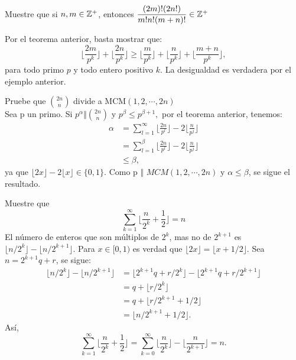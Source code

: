 	\begin{ej}

		Muestre que si $n,m \in \mathbb{Z}^{+}$, entonces $\dfrac{(2m)!(2n!)}{m!n!(m + n)!}\in\mathbb{Z}^{+}$
		
		Por el teorema anterior, basta mostrar que:
		$$\bigg\lfloor\frac{2m}{p^{k}}\bigg\rfloor + \bigg\lfloor\frac{2n}{p^{k}}\bigg\rfloor \geq \biggl\lfloor\frac{m}{p^{k}}\bigg\rfloor + \bigg\lfloor\frac{n}{p^{k}}\bigg\rfloor + \bigg\lfloor\frac{m + n}{p^{k}}\bigg\rfloor,$$ para todo primo $p$ y todo entero positivo $k$. La desigualdad es verdadera por el ejemplo anterior.
	\end{ej}
	\begin{ej}
		Pruebe que $\binom{2n}{n}$ divide a MCM$(1,2,\cdots,2n)$\\
		
		Sea p un primo. Si $p^{\alpha} \Vert \binom{2n}{n} \text{ y } p^{\beta} \leq p^{\beta + 1},$ por el teorema anterior, tenemos:
		\begin{align*}
			\alpha &= \sum_{l=1}^{\infty} \biggl\lfloor\frac{2n}{p^{l}}\biggr\rfloor - 2\bigg\lfloor\frac{n}{p^{j}}\biggr\rfloor\\
			&= \sum_{l=1}^{\beta} \biggl\lfloor\frac{2n}{p^{l}}\biggr\rfloor - 2\bigg\lfloor\frac{n}{p^{j}}\biggr\rfloor\\
			&\leq \beta,
		\end{align*}
		ya que $\lfloor 2x \rfloor - 2\lfloor x \rfloor \in \{0,1\}$. Como p $\Vert$ $MCM(1,2,\cdots,2n) \text{ y } \alpha \leq \beta$, se sigue el resultado.
	\end{ej}
	\begin{ej}
		Muestre que 
		$$\sum_{k=1}^{\infty} \biggr\lfloor \frac{n}{2^{k}} + \frac{1}{2} \biggr\rfloor = n$$
		 El n\'umero de enteros que son m\'ultiplos de $2^{k}$, mas no de $2^{k + 1}$ es \\
		 $\lfloor {n}/{2^{k}} \rfloor - \big\lfloor{n}/{2^{k + 1}} \rfloor$. Para $x \in [0,1)$ es verdad que $\lfloor 2x \rfloor = \lfloor x + 1/2 \rfloor$. Sea $n = 2^{k + 1}q + r$, se sigue:
		 \begin{align*}
		 	\lfloor {n}/{2^{k}} \rfloor - \big\lfloor{n}/{2^{k + 1}} \rfloor &= \lfloor {2^{k+1}q + r}/{2^{k}} \rfloor - \big\lfloor{2^{k+1}q + r}/{2^{k + 1}} \rfloor\\
		 	&= q + \lfloor r/2^{k} \rfloor\\
		 	&= q + \lfloor r/2^{k + 1} + 1/2 \rfloor\\
		 	&= \lfloor n/2^{k+1} + 1/2 \rfloor.
		 \end{align*}
		 As\'i,
		 $$\sum_{k = 1}^{\infty} \biggr\lfloor \frac{n}{2^{k}} + \frac{1}{2} \biggr\rfloor = \sum_{k = 0}^{\infty} \biggr\lfloor \frac{n}{2^{k}} \biggr\rfloor - \biggr\lfloor \frac{n}{2^{k + 1}}  \biggr\rfloor = n.$$		
	\end{ej}
